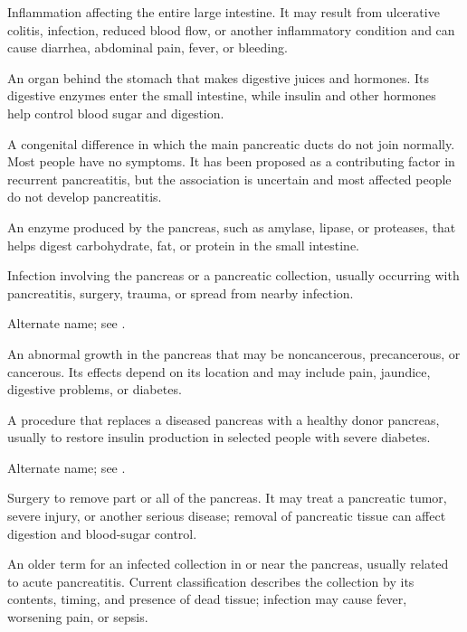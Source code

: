  Inflammation affecting the entire large intestine. It may result from ulcerative colitis, infection, reduced blood flow, or another inflammatory condition and can cause diarrhea, abdominal pain, fever, or bleeding.

 An organ behind the stomach that makes digestive juices and hormones. Its digestive enzymes enter the small intestine, while insulin and other hormones help control blood sugar and digestion.

 A congenital difference in which the main pancreatic ducts do not join normally. Most people have no symptoms. It has been proposed as a contributing factor in recurrent pancreatitis, but the association is uncertain and most affected people do not develop pancreatitis.


 An enzyme produced by the pancreas, such as amylase, lipase, or proteases, that helps digest carbohydrate, fat, or protein in the small intestine.

 Infection involving the pancreas or a pancreatic collection, usually occurring with pancreatitis, surgery, trauma, or spread from nearby infection.

 Alternate name; see .

 An abnormal growth in the pancreas that may be noncancerous, precancerous, or cancerous. Its effects depend on its location and may include pain, jaundice, digestive problems, or diabetes.

 A procedure that replaces a diseased pancreas with a healthy donor pancreas, usually to restore insulin production in selected people with severe diabetes.

 Alternate name; see .

 Surgery to remove part or all of the pancreas. It may treat a pancreatic tumor, severe injury, or another serious disease; removal of pancreatic tissue can affect digestion and blood-sugar control.

 An older term for an infected collection in or near the pancreas, usually related to acute pancreatitis. Current classification describes the collection by its contents, timing, and presence of dead tissue; infection may cause fever, worsening pain, or sepsis.

